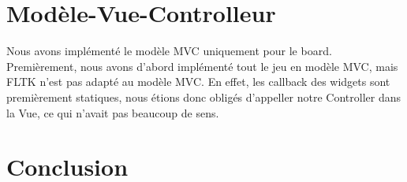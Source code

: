 \documentclass[utf8]{article}
\begin{document}
\begin{large}
\section{Modèle-Vue-Controlleur}
\par
\indent
Nous avons implémenté le modèle MVC uniquement pour le board. Premièrement, nous
avons d'abord implémenté tout le jeu en modèle MVC, mais FLTK n'est pas adapté
au modèle MVC. En effet, les callback des widgets sont premièrement statiques,
nous étions donc obligés d'appeller notre Controller dans la Vue, ce qui n'avait
pas beaucoup de sens.
\par
\section{Conclusion}
\par
\indent

\par

\end{large}
\end{document}
